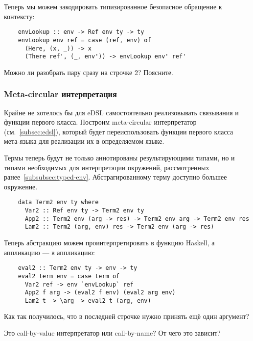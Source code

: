 Теперь мы можем закодировать типизированное безопасное обращение к контексту:
\begin{verbatim}
    envLookup :: env -> Ref env ty -> ty
    envLookup env ref = case (ref, env) of
      (Here, (x, _)) -> x
      (There ref', (_, env')) -> envLookup env' ref'
\end{verbatim}

\begin{task}
    Можно ли разобрать пару сразу на строчке 2?
    Поясните.
\end{task}

\subsubsection{Meta-circular интерпретация} \label{subsubsec:meta-circular-initial}

Крайне не хотелось бы для eDSL самостоятельно реализовывать связывания и функции первого класса.
Построим meta-circular интерпретатор (см.~\ref{subsec:edsl}), который будет переиспользовать функции первого класса мета-языка для реализации их в определяемом языке.

Термы теперь будут не только аннотированы результирующими типами, но и типами необходимых для интерпретации окружений, рассмотренных ранее~\ref{subsubsec:typed-env}.
Абстрагированному терму доступно большее окружение.

\begin{verbatim}
    data Term2 env ty where
      Var2 :: Ref env ty -> Term2 env ty
      App2 :: Term2 env (arg -> res) -> Term2 env arg -> Term2 env res
      Lam2 :: Term2 (arg, env) res -> Term2 env (arg -> res)
\end{verbatim}

Теперь абстракцию можем проинтерпретировать в функцию Haskell, а аппликацию --- в аппликацию:
\begin{verbatim}
    eval2 :: Term2 env ty -> env -> ty
    eval2 term env = case term of
      Var2 ref -> env `envLookup` ref
      App2 f arg -> (eval2 f env) (eval2 arg env)
      Lam2 t -> \arg -> eval2 t (arg, env)
\end{verbatim}

\begin{task}
    Как так получилось, что в последней строчке нужно принять ещё один аргумент?
\end{task}

\begin{task}
    Это call-by-value интерпретатор или call-by-name?
    От чего это зависит?
\end{task}

